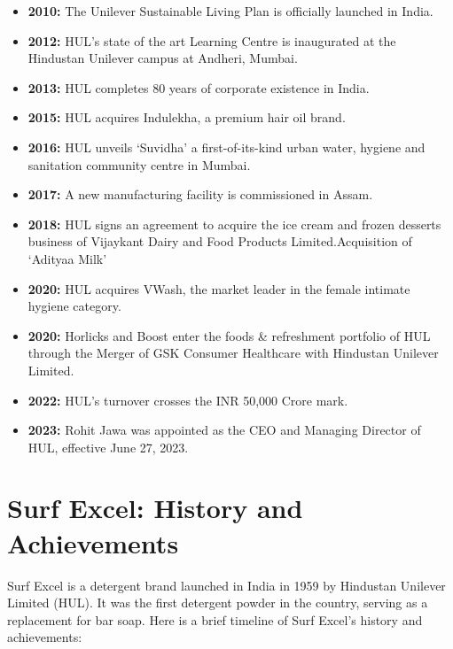 \begin{itemize}
    \item \textbf{2010:} The Unilever Sustainable Living Plan is officially launched in India.
    
    \item \textbf{2012:} HUL's state of the art Learning Centre is inaugurated at the Hindustan Unilever campus at Andheri, Mumbai.
    
    \item \textbf{2013:} HUL completes 80 years of corporate existence in India.
    
    \item \textbf{2015:} HUL acquires Indulekha, a premium hair oil brand.
    
    \item \textbf{2016:} HUL unveils ‘Suvidha’ a first-of-its-kind urban water, hygiene and sanitation community centre in Mumbai.
    
    \item \textbf{2017:} A new manufacturing facility is commissioned in Assam.
    
    \item \textbf{2018:} HUL signs an agreement to acquire the ice cream and frozen desserts business of Vijaykant Dairy and Food Products Limited.Acquisition of ‘Adityaa Milk’
    
    \item \textbf{2020:} HUL acquires VWash, the market leader in the female intimate hygiene category.
    
    \item \textbf{2020:} Horlicks and Boost enter the foods \& refreshment portfolio of HUL through the Merger of GSK Consumer Healthcare with Hindustan Unilever Limited. 
    
    \item \textbf{2022:} HUL's turnover crosses the INR 50,000 Crore mark.
    
    \item \textbf{2023:} Rohit Jawa was appointed as the CEO and Managing Director of HUL, effective June 27, 2023.
\end{itemize}

\section{Surf Excel: History and Achievements}

Surf Excel is a detergent brand launched in India in 1959 by Hindustan Unilever Limited (HUL). It was the first detergent powder in the country, serving as a replacement for bar soap. Here is a brief timeline of Surf Excel's history and achievements:

